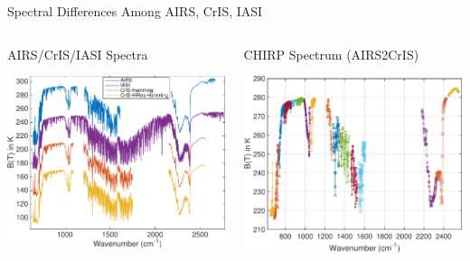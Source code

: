 \documentclass[10pt,t]{beamer}
\begin{document}
\begin{frame}[label={sec:org465e899}]{Spectral Differences Among AIRS, CrIS, IASI}
\vspace{-0.2in}
\begin{columns}
\begin{column}{0.55\columnwidth}
\begin{block}{AIRS/CrIS/IASI Spectra}
\begin{center}
\includegraphics[width=\linewidth]{./Figs/Pdf/hyperall_hamming.pdf}
\end{center}
\end{block}
\end{column}


\begin{column}{0.55\columnwidth}
\begin{block}{CHIRP Spectrum (AIRS2CrIS)}
\begin{center}
\includegraphics[width=\linewidth]{./Figs/Pdf/a2c_full.pdf}
\end{center}
\end{block}
\end{column}
\end{columns}


\end{frame}
\end{document}
